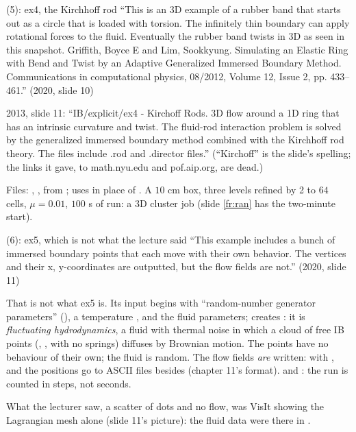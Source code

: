 \documentclass[aspectratio=169,11pt]{beamer}
\begin{document}
\begin{frame}{ (5): ex4, the Kirchhoff rod}
\label{fr:ib45}
\footnotesize {} ``This is an 3D example of a rubber band that starts out as a circle that is loaded with torsion. The infinitely thin boundary can apply rotational forces to the fluid. Eventually the rubber band twists in 3D as seen in this snapshot. Griffith, Boyce E and Lim, Sookkyung. Simulating an Elastic Ring with Bend and Twist by an Adaptive Generalized Immersed Boundary Method. Communications in computational physics, 08/2012, Volume 12, Issue 2, pp. 433--461.'' (2020, slide 10)
\vspace{1mm}

\scriptsize 2013, slide 11: ``IB/explicit/ex4 - Kirchoff Rods. 3D flow around a 1D ring that has an intrinsic curvature and twist. The fluid-rod interaction problem is solved by the generalized immersed boundary method combined with the Kirchhoff rod theory. The files include .rod and .director files.'' (``Kirchoff'' is the slide's spelling; the links it gave, to math.nyu.edu and pof.aip.org, are dead.)
\vspace{1mm}

\scriptsize Files: , ,  from ;  uses  in place of . A $10$ cm box, three levels refined by 2 to $64$ cells, $\mu = 0.01$, $100$ s of run: a 3D cluster job (slide \ref{fr:ran} has the two-minute start).
\end{frame}

\begin{frame}{ (6): ex5, which is not what the lecture said}
\label{fr:ib5}
\footnotesize {} ``This example includes a bunch of immersed boundary points that each move with their own behavior. The vertices and their x, y-coordinates are outputted, but the flow fields are not.'' (2020, slide 11)
\vspace{1mm}

\footnotesize That is not what ex5 is. Its input begins with ``random-number generator parameters'' (), a temperature , and the fluid parameters;  creates : it is \emph{fluctuating hydrodynamics}, a fluid with thermal noise in which a cloud of free IB points (, , with no springs) diffuses by Brownian motion. The points have no behaviour of their own; the fluid is random. The flow fields \emph{are} written:  with , and the positions go to ASCII  files besides (chapter 11's format).  and : the run is counted in steps, not seconds.
\vspace{1mm}

\scriptsize What the lecturer saw, a scatter of dots and no flow, was VisIt showing the Lagrangian mesh alone (slide 11's picture): the fluid data were there in .
\end{frame}
\end{document}
